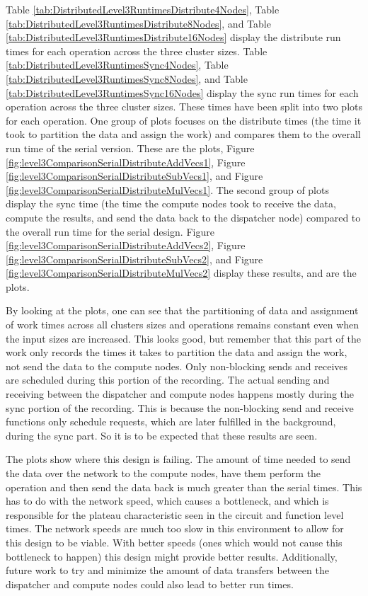 Table \ref{tab:DistributedLevel3RuntimesDistribute4Nodes}, Table \ref{tab:DistributedLevel3RuntimesDistribute8Nodes}, and Table \ref{tab:DistributedLevel3RuntimesDistribute16Nodes} display the distribute run times for each operation across the three cluster sizes. Table \ref{tab:DistributedLevel3RuntimesSync4Nodes}, Table \ref{tab:DistributedLevel3RuntimesSync8Nodes}, and Table \ref{tab:DistributedLevel3RuntimesSync16Nodes} display the sync run times for each operation across the three cluster sizes. These times have been split into two plots for each operation. One group of plots focuses on the distribute times (the time it took to partition the data and assign the work) and compares them to the overall run time of the serial version. These are the  plots, Figure \ref{fig:level3ComparisonSerialDistributeAddVecs1}, Figure \ref{fig:level3ComparisonSerialDistributeSubVecs1}, and Figure \ref{fig:level3ComparisonSerialDistributeMulVecs1}. The second group of plots display the sync time (the time the compute nodes took to receive the data, compute the results, and send the data back to the dispatcher node) compared to the overall run time for the serial design. Figure \ref{fig:level3ComparisonSerialDistributeAddVecs2}, Figure \ref{fig:level3ComparisonSerialDistributeSubVecs2}, and Figure \ref{fig:level3ComparisonSerialDistributeMulVecs2} display these results, and are the  plots.

By looking at the  plots, one can see that the partitioning of data and assignment of work times across all clusters sizes and operations remains constant even when the input sizes are increased. This looks good, but remember that this part of the work only records the times it takes to partition the data and assign the work, not send the data to the compute nodes. Only non-blocking sends and receives are scheduled during this portion of the recording. The actual sending and receiving between the dispatcher and compute nodes happens mostly during the sync portion of the recording. This is because the non-blocking send and receive functions only schedule requests, which are later fulfilled in the background, during the sync part. So it is to be expected that these results are seen.

The  plots show where this design is failing. The amount of time needed to send the data over the network to the compute nodes, have them perform the operation and then send the data back is much greater than the serial times. This has to do with the network speed, which causes a bottleneck, and which is responsible for the plateau characteristic seen in the circuit and function level times. The network speeds are much too slow in this environment to allow for this design to be viable. With better speeds (ones which would not cause this bottleneck to happen) this design might provide better results. Additionally, future work to try and minimize the amount of data transfers between the dispatcher and compute nodes could also lead to better run times.

